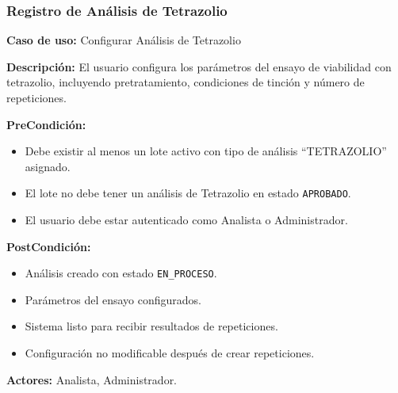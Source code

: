 \subsubsection{Registro de Análisis de Tetrazolio}

\noindent\textbf{Caso de uso:} Configurar Análisis de Tetrazolio

\vspace{0.5em}
\noindent\textbf{Descripción:} El usuario configura los parámetros del ensayo de viabilidad con tetrazolio, incluyendo pretratamiento, condiciones de tinción y número de repeticiones.

\vspace{0.5em}
\noindent\textbf{PreCondición:}
\begin{itemize}[nosep]
    \item Debe existir al menos un lote activo con tipo de análisis ``TETRAZOLIO'' asignado.
    \item El lote no debe tener un análisis de Tetrazolio en estado \texttt{APROBADO}.
    \item El usuario debe estar autenticado como Analista o Administrador.
\end{itemize}

\vspace{0.5em}
\noindent\textbf{PostCondición:}
\begin{itemize}[nosep]
    \item Análisis creado con estado \texttt{EN\_PROCESO}.
    \item Parámetros del ensayo configurados.
    \item Sistema listo para recibir resultados de repeticiones.
    \item Configuración no modificable después de crear repeticiones.
\end{itemize}

\vspace{0.5em}
\noindent\textbf{Actores:} Analista, Administrador.

